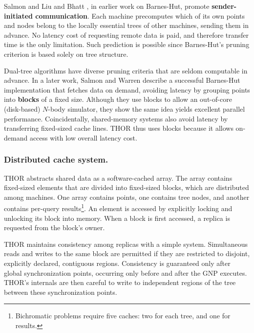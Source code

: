 \documentclass[twoside,leqno,twocolumn]{article}
\newcommand{\mysubsub}[1]{\subsubsection{#1.}}
\newcommand{\defterm}[1]{{\bf #1}}
\begin{document}
Salmon \cite{salmon_thesis} and Liu and Bhatt \cite{liu94experiences}, in earlier work on Barnes-Hut, promote \defterm{sender-initiated communication}.
Each machine precomputes which of its own points and nodes belong to the locally essential trees of other machines, sending them in advance.
No latency cost of requesting remote data is paid, and therefore transfer time is the only limitation.
Such prediction is possible since Barnes-Hut's pruning criterion is based solely on tree structure.

Dual-tree algorithms have diverse pruning criteria that are seldom computable in advance.
In a later work, Salmon and Warren describe \cite{salmon97parallel} a successful Barnes-Hut implementation that fetches data on demand, avoiding latency by grouping points into \defterm{blocks} of a fixed size.
Although they use blocks to allow an out-of-core (disk-based) $N$-body simulator, they show the same idea yields excellent parallel performance.
Coincidentally, shared-memory systems also avoid latency by transferring fixed-sized cache lines.
THOR thus uses blocks because it allows on-demand access with low overall latency cost.

\mysubsub{Distributed cache system}

THOR abstracts shared data as a software-cached array.
The array contains fixed-sized elements that are divided into fixed-sized blocks, which are distributed among machines.
One array contains points, one contains tree nodes, and another contains per-query results\footnote{Bichromatic problems require five caches: two for each tree, and one for results.}.
An element is accessed by explicitly locking and unlocking its block into memory.
When a block is first accessed, a replica is requested from the block's owner.

THOR maintains consistency among replicas with a simple system.
Simultaneous reads and writes to the same block are permitted if they are restricted to disjoint, explicitly declared, contiguous regions.
Consistency is guaranteed only after global synchronization points, occurring only before and after the GNP executes.
THOR's internals are then careful to write to independent regions of the tree between these synchronization points.

\end{document}
